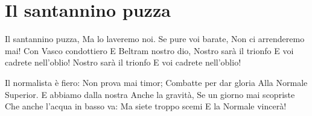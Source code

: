 \section{Il santannino puzza}
\subtitle{Sulla melodia della “Virginia Company”}
\begin{canzone}
Il santannino puzza,
Ma lo laveremo noi.
Se pure voi barate,
Non ci arrenderemo mai!
Con Vasco condottiero
E Beltram nostro dio,
Nostro sarà il trionfo
E voi cadrete nell’oblio!
Nostro sarà il trionfo
E voi cadrete nell’oblio!

Il normalista è fiero:
Non prova mai timor;
Combatte per dar gloria
Alla Normale Superior.
E abbiamo dalla nostra
Anche la gravità,
Se un giorno mai scopriste
Che anche l’acqua in basso va:
Ma siete troppo scemi
E la Normale vincerà!
\end{canzone}
